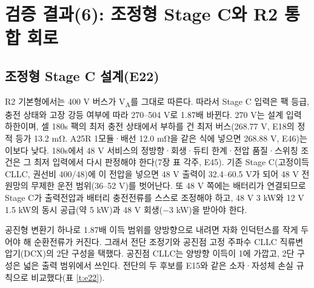 \chapter{검증 결과(6): 조정형 Stage C와 R2 통합 회로}

\section{조정형 Stage C 설계(E22)}

R2 기본형에서는 400 V 버스가 V\textsubscript{A}를 그대로 따른다. 따라서 Stage C 입력은 팩 등급, 충전 상태와 고장 강등 여부에 따라 270–504 V로 1.87배 바뀐다. 270 V는 설계 입력 하한이며, 셀 180s 팩의 최저 충전 상태에서 부하를 건 최저 버스(268.77 V, E18의 정적 등가 13.2 mΩ. A25R 1모듈·배선 12.0 mΩ을 같은 식에 넣으면 268.88 V, E46)는 이보다 낮다. 180s에서 48 V 서비스의 정방향·회생·듀티 한계·전압 품질·스위칭 조건은 그 최저 입력에서 다시 판정해야 한다(7장 표 각주, E45). 기존 Stage C(고정이득 CLLC, 권선비 400/48)에 이 전압을 넣으면 48 V 출력이 32.4–60.5 V가 되어 48 V 전원망의 무제한 운전 범위(36–52 V)\cite{b10}를 벗어난다. 또 48 V 쪽에는 배터리가 연결되므로 Stage C가 출력전압과 배터리 충전전류를 스스로 조정해야 하고, 48 V 3 kW와 12 V 1.5 kW의 동시 공급(약 5 kW)과 48 V 회생(−3 kW)을 받아야 한다.

공진형 변환기 하나로 1.87배 이득 범위를 양방향으로 내려면 자화 인덕턴스를 작게 두어야 해 순환전류가 커진다. 그래서 전단 조정기와 공진점 고정 주파수 CLLC 직류변압기(DCX)의 2단 구성을 택했다. 공진점 CLLC는 양방향 이득이 1에 가깝고\cite{b17}, 2단 구성은 넓은 출력 범위에서 쓰인다\cite{b18}. 전단의 두 후보를 E15와 같은 소자·자성체 손실 규칙으로 비교했다(표 \ref{t:e22}).

